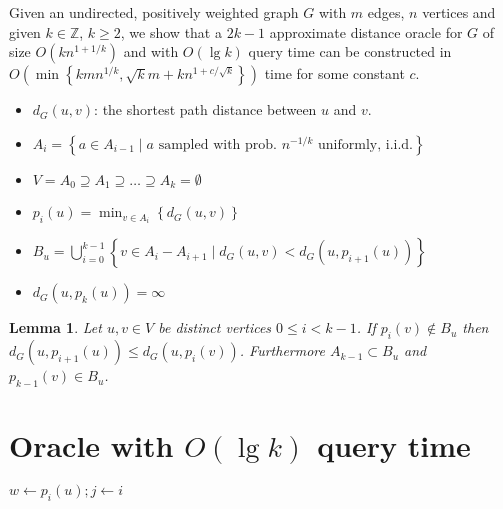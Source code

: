 \documentclass[12pt]{article}
\newtheorem{lem}[thm]{Lemma}
\begin{document}


Given an undirected, positively weighted graph $G$ with $m$ edges, $n$ vertices and given $k \in \mathbb{Z}$, $k \geq 2$, we show that a $2k-1$ approximate distance oracle for $G$ of size $O(kn^{1+1/k})$ and with $O(\lg k)$ query time can be constructed in $O( \min \left\{ kmn^{1/k}, \sqrt{k}m+kn^{1+c/\sqrt{k}} \right\})$ time for some constant $c$.
\begin{itemize}
\item $d_{G}(u,v)$: the shortest path distance between $u$ and $v$.
\item $A_i = \left\{ a \in A_{i-1} \; | \; a \text{ sampled with prob. } n^{-1/k} \text{ uniformly, i.i.d.} \right\}$
\item $V = A_0 \supseteq A_1 \supseteq \hdots \supseteq A_k = \emptyset$
\item $p_i(u) = \min_{v \in A_i} \left\{ d_{G}(u,v) \right\}$
\item $B_u=\bigcup_{i=0}^{k-1}\left\{ v \in A_i - A_{i+1} \; | \; d_{G}(u,v) < d_{G}(u, p_{i+1}(u)) \right\}$
\item $d_G(u,p_k(u))=\infty$
\end{itemize}

\begin{lem}
Let $u,v \in V$ be distinct vertices $0 \leq i < k-1$. If $p_i(v) \not\in B_{u}$ then $d_G(u, p_{i+1}(u)) \leq d_G(u, p_i(v))$. Furthermore $A_{k-1} \subset B_u$ and $p_{k-1}(v) \in B_u$. \label{lem:onedeltaperiteration}
\end{lem}

\section{Oracle with $O(\lg k)$ query time}
\begin{Walgo}[ht]{20pt}
  \DontPrintSemicolon
  \Indm
    \Indp
    \BlankLine
    $w \leftarrow p_i(u); j \leftarrow i$
    
    
    \caption{$dist_k(u,v,i)$}
    \label{alg:0.1}
\end{Walgo}
\end{document}
